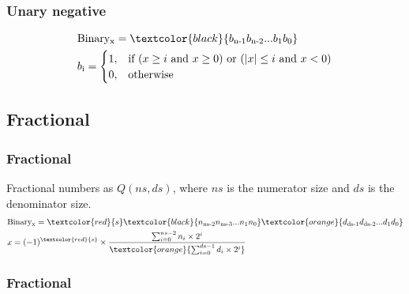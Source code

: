 \begin{frame}
    \frametitle{Unary negative}
    \begin{equation}
        \begin{aligned}
            &\text{Binary}\textsubscript{x}=\textcolor{black}{b\textsubscript{n-1}b\textsubscript{n-2}...b\textsubscript{1}b\textsubscript{0}}\\
            &b\textsubscript{i}=
                \begin{cases}
                    1, & \text{if } (x\geq i \text{ and } x \geq 0)  \text{ or } (|x| \leq i \text{ and } x < 0)\\
                    0,& \text{otherwise}\\
                \end{cases}
        \end{aligned}
    \end{equation}
\end{frame}


\subsection{Fractional}
\begin{frame}
    \frametitle{Fractional}
    Fractional numbers as $Q(ns, ds)$, where $ns$ is the numerator size and $ds$ is the denominator size.
    \begin{equation}
        \begin{aligned}
            &\text{Binary}\textsubscript{x}=\textcolor{red}{s}\textcolor{black}{n\textsubscript{ns-2}n\textsubscript{ns-3}...n\textsubscript{1}n\textsubscript{0}}\textcolor{orange}{d\textsubscript{ds-1}d\textsubscript{ds-2}...d\textsubscript{1}d\textsubscript{0}}\\
            &x=(-1)^{\textcolor{red}{s}} \times \frac{\sum_{i=0}^{ns-2} n_i \times 2^i}{\textcolor{orange}{\sum_{i=0}^{ds-1} d_i \times 2^i}}
        \end{aligned}
    \end{equation}
\end{frame}

\begin{frame}
    \frametitle{Fractional}
\end{frame}


